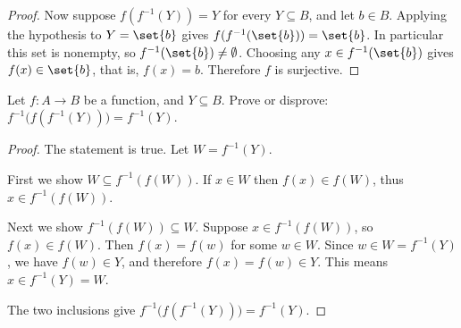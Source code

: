 \documentclass[DIN, pagenumber=false, fontsize=11pt, parskip=half]{scrartcl}
\begin{document}
\begin{problems}
\begin{proof}
        Now suppose $f(f^{-1}(Y)) = Y$ for every $Y \subseteq B$, and let $b \in B$. Applying the hypothesis to $Y = \set{b}$ gives $f(f^{-1}(\set{b})) = \set{b}$. In particular this set is nonempty, so $f^{-1}(\set{b}) \neq \emptyset$. Choosing any $x \in f^{-1}(\set{b})$ gives $f(x) \in \set{b}$, that is, $f(x) = b$. Therefore $f$ is surjective.
    \end{proof}

    \problem Let $f : A \to B$ be a function, and $Y \subseteq B$. Prove or disprove: $f^{-1}\big(f(f^{-1}(Y))\big) = f^{-1}(Y)$.
    \begin{proof}
        The statement is true. Let $W = f^{-1}(Y)$.

        First we show $W \subseteq f^{-1}(f(W))$. 
        If $x \in W$ then $f(x) \in f(W)$, thus $x \in f^{-1}(f(W))$.

        Next we show $f^{-1}(f(W)) \subseteq W$.
        Suppose $x \in f^{-1}(f(W))$, so $f(x) \in f(W)$.
        Then $f(x) = f(w)$ for some $w \in W$.
        Since $w \in W = f^{-1}(Y)$, we have $f(w) \in Y$, and therefore $f(x) = f(w) \in Y$.
        This means $x \in f^{-1}(Y) = W$.

        The two inclusions give $f^{-1}\big(f(f^{-1}(Y))\big) = f^{-1}(Y)$.
    \end{proof}
\end{problems}
\end{document}
